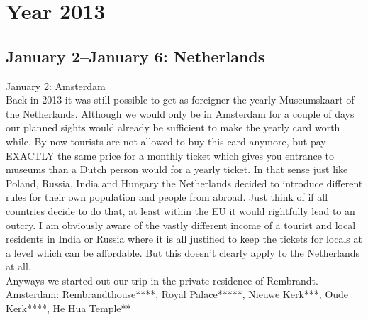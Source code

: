 \chapter{Year 2013}
\label{2013}

\section{January 2--January 6: Netherlands}
\label{2013:Netherlands}

January 2: Amsterdam\\
Back in 2013 it was still possible to get as foreigner the yearly Museumskaart of the Netherlands. Although we would only be in Amsterdam for a couple of days our planned sights would already be sufficient to make the yearly card worth while. By now tourists are not allowed to buy this card anymore, but pay EXACTLY the same price for a monthly ticket which gives you entrance to museums than a Dutch person would for a yearly ticket. In that sense just like Poland, Russia, India and Hungary the Netherlands decided to introduce different rules for their own population and people from abroad. Just think of if all countries decide to do that, at least within the EU it would rightfully lead to an outcry. I am obviously aware of the vastly different income of a tourist and local residents in India or Russia where it is all justified to keep the tickets for locals at a level which can be affordable. But this doesn't clearly apply to the Netherlands at all.\\

Anyways we started out our trip in the private residence of Rembrandt.\\

Amsterdam: Rembrandthouse****, Royal Palace*****, Nieuwe Kerk***, Oude Kerk****, He Hua Temple**\\


